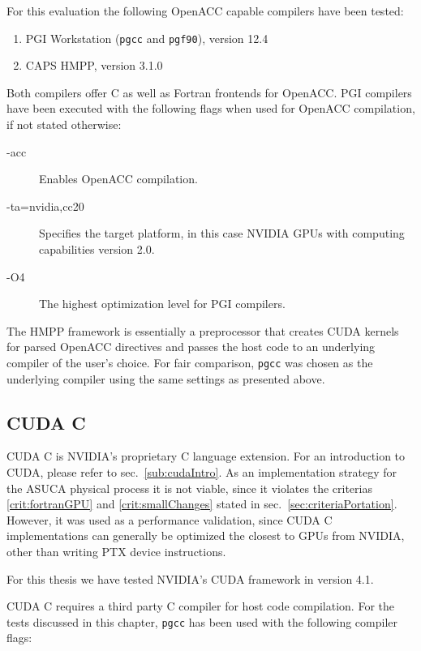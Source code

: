 For this evaluation the following OpenACC capable compilers have been tested: 

\begin{enumerate}
 \item PGI Workstation (\verb|pgcc| and \verb|pgf90|), version 12.4
 \item CAPS HMPP, version 3.1.0
\end{enumerate}

Both compilers offer C as well as Fortran frontends for OpenACC. PGI compilers have been executed with the following flags when used for OpenACC compilation, if not stated otherwise: 

\begin{description}
 \item[-acc] Enables OpenACC compilation.
 \item[-ta=nvidia,cc20] Specifies the target platform, in this case NVIDIA GPUs with computing capabilities version 2.0.
 \item[-O4] The highest optimization level for PGI compilers.
\end{description}

The HMPP framework is essentially a preprocessor that creates CUDA kernels for parsed OpenACC directives and passes the host code to an underlying compiler of the user's choice. For fair comparison, \verb|pgcc| was chosen as the underlying compiler using the same settings as presented above.

\subsection{CUDA C} \label{sub:cudaC}

CUDA C is NVIDIA's proprietary C language extension. For an introduction to CUDA, please refer to sec.~\ref{sub:cudaIntro}. As an implementation strategy for the ASUCA physical process it is not viable, since it violates the criterias \ref{crit:fortranGPU} and \ref{crit:smallChanges} stated in sec.~\ref{sec:criteriaPortation}. However, it was used as a performance validation, since CUDA C implementations can generally be optimized the closest to GPUs from NVIDIA, other than writing PTX device instructions.

For this thesis we have tested NVIDIA's CUDA framework in version 4.1. 

CUDA C requires a third party C compiler for host code compilation. For the tests discussed in this chapter, \verb|pgcc| has been used with the following compiler flags:


